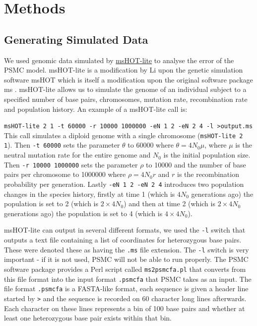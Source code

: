 \documentclass[11pt,a4paper]{article}
\begin{document}
\section{Methods}\label{sec:methods}
\subsection{Generating Simulated Data} %
We used genomic data simulated by \href{https://github.com/lh3/foreign/tree/master/msHOT-lite}{msHOT-lite} \cite{mshotlite} to analyse the error of the PSMC model. msHOT-lite is a modification by Li upon the genetic simulation software msHOT \cite{hellenthal2007mshot} which is itself a modification upon the original software package ms \cite{hudson2002generating}. msHOT-lite allows us to simulate the genome of an individual subject to a specified number of base pairs, chromosomes, mutation rate, recombination rate and population history. 
An example of a msHOT-lite call is: 

\verb|msHOT-lite 2 1 -t 60000 -r 10000 1000000 -eN 1 2 -eN 2 4 -l >output.ms| 
This call simulates a diploid genome with a single chromosome (\verb|msHOT-lite 2 1|). Then \verb|-t 60000| sets the parameter $\theta$ to 60000 where $\theta=4N_0\mu$, where $\mu$ is the neutral mutation rate for the entire genome and $N_0$ is the initial population size. Then \verb|-r 10000 1000000| sets the parameter $\rho$ to 10000 and the number of base pairs per chromosome to 1000000 where $\rho=4N_0r$ and $r$ is the recombination probability per generation. Lastly \verb|-eN 1 2 -eN 2 4| introduces two population changes in the species history, firstly at time 1 (which is $4N_0$ generations ago) the population is set to 2 (which is $2\times4N_0$) and then at time 2 (which is $2\times4N_0$ generations ago) the population is set to 4 (which is $4\times4N_0$).

msHOT-lite can output in several different formats, we used the \verb|-l| switch that outputs a text file containing a list of coordinates for heterozygous base pairs. These were denoted these as having the \verb|.ms| file extension. The \verb|-l| switch is very important - if it is not used, PSMC will not be able to run properly. The PSMC software package \cite{li2011inference} provides a Perl script called \verb|ms2psmcfa.pl| that converts from this file format into the input format \verb|.psmcfa| that PSMC takes as an input. The file format \verb|.psmcfa| is a FASTA-like format, each sequence is given a header line started by \verb|>| and the sequence is recorded on 60 character long lines afterwards. Each character on these lines represents a bin of 100 base pairs and whether at least one heterozygous base pair exists within that bin.
\end{document}
